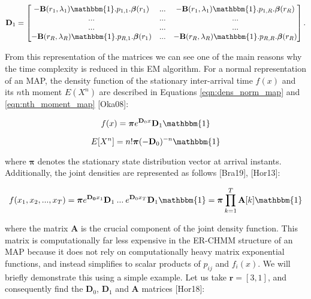 \documentclass[a4paper,11pt,titlepage]{article}
\begin{document}
\begin{equation}
    \mathbf{D}_1 = \begin{bmatrix}
     -\mathbf{B}(r_1,\lambda_1) \mathbbm{1} .p_{1,1}.\bm{\beta}(r_1) & ... & -\mathbf{B}(r_1,\lambda_1) \mathbbm{1} .p_{1,R}.\bm{\beta}(r_R)   \\
     ... & ... & ... \\
     ... & ... & ... \\
     -\mathbf{B}(r_R,\lambda_R) \mathbbm{1} .p_{R,1}.\bm{\beta}(r_1)  & ... & -\mathbf{B}(r_R,\lambda_R) \mathbbm{1} .p_{R,R}.\bm{\beta}(r_R)
    \end{bmatrix}.
    \label{eqn:D1_erlang}
\end{equation}

From this representation of the matrices we can see one of the main reasons why the time complexity is reduced in this EM algorithm. For a normal representation of an MAP, the density function of the stationary inter-arrival time $f(x)$ and its $n$th moment $E(X^n)$ are described in Equations \ref{eqn:dens_norm_map} and \ref{eqn:nth_moment_map} [Oka08]:

\begin{equation}
    f(x) = \bm{\pi} e^{\mathbf{D}_0 x} \mathbf{D}_1 \mathbbm{1}
    \label{eqn:dens_norm_map}
\end{equation}

\begin{equation}
    E[X^n] = n! \bm{\pi}(-\mathbf{D}_0)^{-n} \mathbbm{1}
    \label{eqn:nth_moment_map}
\end{equation} 

where $\bm{\pi}$ denotes the stationary state distribution vector at arrival instants. Additionally, the joint densities are represented as follows [Bra19], [Hor13]:

\begin{equation}
    f(x_1,x_2,...,x_T) = \bm{\pi} e^{\mathbf{D_0}x_1}\mathbf{D}_1 \: ... \: e^{\mathbf{D}_0 x_T}\mathbf{D}_1 \mathbbm{1} = \bm{\pi} \prod_{k=1}^{T} \mathbf{A}[k] \mathbbm{1}
\end{equation}

where the matrix $\mathbf{A}$ is the crucial component of the joint density function. This matrix is computationally far less expensive in the ER-CHMM structure of an MAP because it does not rely on computationally heavy matrix exponential functions, and instead simplifies to scalar products of $p_{ij}$ and $f_i(x)$. We will briefly demonstrate this using a simple example. Let us take $\mathbf{r} = [3,1]$, and consequently find the $\mathbf{D}_0$, $\mathbf{D}_1$ and $\mathbf{A}$ matrices [Hor18]:
\end{document}
